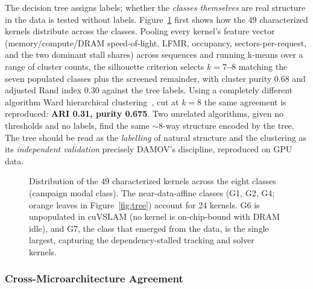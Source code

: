 The decision tree assigns labels; whether the \emph{classes themselves} are real structure in the data is tested without labels. Figure~\ref{fig:taxonomy} first shows how the 49 characterized kernels distribute across the classes. Pooling every kernel's feature vector (memory/compute/DRAM speed-of-light, LFMR, occupancy, sectors-per-request, and the two dominant stall shares) across sequences and running k-means over a range of cluster counts, the silhouette criterion selects \textbf{$k = 7$--$8$} matching the seven populated classes plus the screened remainder, with cluster purity 0.68 and adjusted Rand index 0.30 against the tree labels. Using a completely different algorithm Ward hierarchical clustering~\cite{ward1963}, cut at $k{=}8$ the same agreement is reproduced: \textbf{ARI 0.31, purity 0.675}. Two unrelated algorithms, given no thresholds and no labels, find the same $\sim$8-way structure encoded by the tree. The tree should be read as the \emph{labelling} of natural structure and the clustering as its \emph{independent validation} precisely DAMOV's discipline, reproduced on GPU data.

\begin{figure}[t]
\centering
{}
\vspace{-2mm}
\caption[Kernel distribution across the taxonomy.]{Distribution of the 49
characterized kernels across the eight classes (campaign modal class). The
near-data-affine classes (G1, G2, G4; orange leaves in Figure~\ref{fig:tree})
account for 24 kernels. G6 is unpopulated in cuVSLAM (no kernel is on-chip-bound
with DRAM idle), and G7, the class that emerged from the data, is the single
largest, capturing the dependency-stalled tracking and solver kernels.}
\label{fig:taxonomy}
\end{figure}

\subsubsection{Cross-Microarchitecture Agreement}
\label{sec:char-crossdev}


